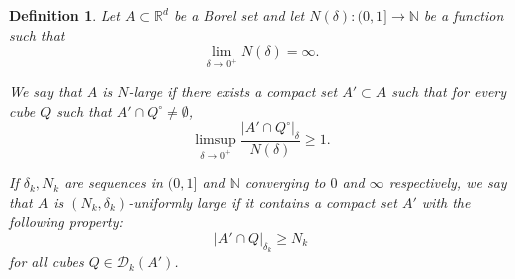 \documentclass[12pt]{amsart}
\newtheorem{definition}[theorem]{Definition}
\def\R{{\mathbb{R}}}
\def\N{{\mathbb{N}}}
\numberwithin{theorem}{section}
\numberwithin{equation}{section}
\begin{document}
\begin{definition} \label{def:large-set}
    Let $A\subset\R^d$ be a Borel set and let $N(\delta):(0,1]\to\N$ be a function such that
    \[
        \lim_{\delta\to 0^{+}} N(\delta) = \infty.
    \]

    We say that $A$ is \emph{$N$-large} if there exists a compact set $A'\subset A$ such that for every cube $Q$ such that $A'\cap Q^{\circ}\neq\emptyset$,
    \[
       \limsup_{\delta\to 0^{+}} \frac{|A'\cap Q^{\circ}|_{\delta}}{N(\delta)} \ge 1.
    \]

    If $\delta_k, N_k$ are sequences in $(0,1]$ and $\N$ converging to $0$ and $\infty$ respectively, we say that $A$ is \emph{$(N_k,\delta_k)$-uniformly large} if it contains a compact set $A'$ with the following property:
    \[
        |A'\cap Q|_{\delta_k} \ge N_k
    \]
    for all cubes $Q\in\mathcal{D}_k(A')$.
\end{definition}
\end{document}
